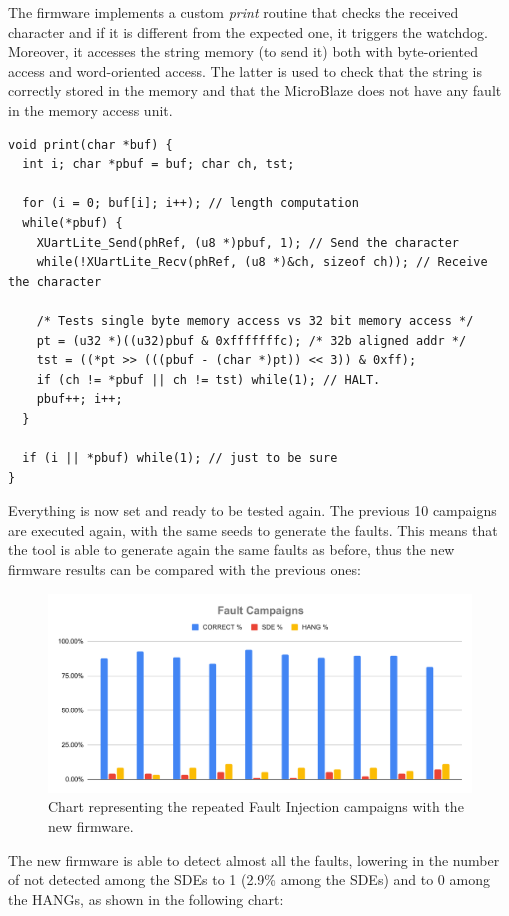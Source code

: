 The firmware implements a custom \textit{print} routine that checks the received character and if it is different from the expected one, it triggers the watchdog. Moreover, it accesses the string memory (to send it) both with byte-oriented access and word-oriented access. The latter is used to check that the string is correctly stored in the memory and that the MicroBlaze does not have any fault in the memory access unit.

\begin{lstlisting}[style=C]
void print(char *buf) {
  int i; char *pbuf = buf; char ch, tst;

  for (i = 0; buf[i]; i++); // length computation
  while(*pbuf) {
    XUartLite_Send(phRef, (u8 *)pbuf, 1); // Send the character
    while(!XUartLite_Recv(phRef, (u8 *)&ch, sizeof ch)); // Receive the character

    /* Tests single byte memory access vs 32 bit memory access */
    pt = (u32 *)((u32)pbuf & 0xfffffffc); /* 32b aligned addr */
    tst = ((*pt >> (((pbuf - (char *)pt)) << 3)) & 0xff); 
    if (ch != *pbuf || ch != tst) while(1); // HALT.
    pbuf++; i++;
  }

  if (i || *pbuf) while(1); // just to be sure
}
\end{lstlisting}

Everything is now set and ready to be tested again. The previous 10 campaigns are executed again, with the same seeds to generate the faults. This means that the tool is able to generate again the same faults as before, thus the new firmware results can be compared with the previous ones:

\begin{figure}[H]
\centering
\includegraphics[width=0.95\linewidth]{images/chapter5/cici_cici.pdf}
\caption{Chart representing the repeated Fault Injection campaigns with the new firmware.}
\end{figure}

The new firmware is able to detect almost all the faults, lowering in the number of not detected among the SDEs to 1 (2.9\% among the SDEs) and to 0 among the HANGs, as shown in the following chart:

